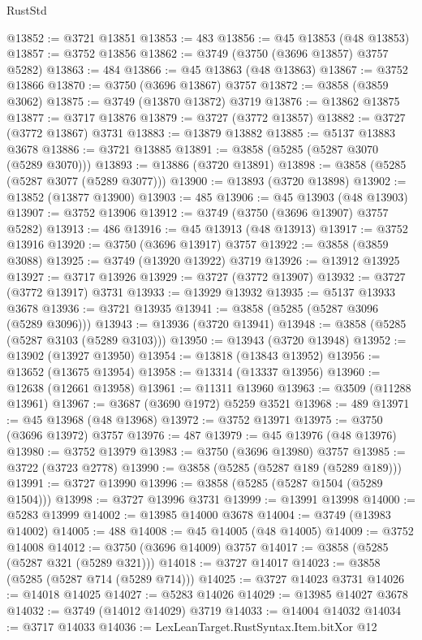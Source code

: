 \begin{lexlean}{RustStd}
\begin{coremodule}
@13852 := @3721 @13851
@13853 := 483
@13856 := @45 @13853 (@48 @13853)
@13857 := @3752 @13856
@13862 := @3749 (@3750 (@3696 @13857) @3757 @5282)
@13863 := 484
@13866 := @45 @13863 (@48 @13863)
@13867 := @3752 @13866
@13870 := @3750 (@3696 @13867) @3757
@13872 := @3858 (@3859 @3062)
@13875 := @3749 (@13870 @13872) @3719
@13876 := @13862 @13875
@13877 := @3717 @13876
@13879 := @3727 (@3772 @13857)
@13882 := @3727 (@3772 @13867) @3731
@13883 := @13879 @13882
@13885 := @5137 @13883 @3678
@13886 := @3721 @13885
@13891 := @3858 (@5285 (@5287 @3070 (@5289 @3070)))
@13893 := @13886 (@3720 @13891)
@13898 := @3858 (@5285 (@5287 @3077 (@5289 @3077)))
@13900 := @13893 (@3720 @13898)
@13902 := @13852 (@13877 @13900)
@13903 := 485
@13906 := @45 @13903 (@48 @13903)
@13907 := @3752 @13906
@13912 := @3749 (@3750 (@3696 @13907) @3757 @5282)
@13913 := 486
@13916 := @45 @13913 (@48 @13913)
@13917 := @3752 @13916
@13920 := @3750 (@3696 @13917) @3757
@13922 := @3858 (@3859 @3088)
@13925 := @3749 (@13920 @13922) @3719
@13926 := @13912 @13925
@13927 := @3717 @13926
@13929 := @3727 (@3772 @13907)
@13932 := @3727 (@3772 @13917) @3731
@13933 := @13929 @13932
@13935 := @5137 @13933 @3678
@13936 := @3721 @13935
@13941 := @3858 (@5285 (@5287 @3096 (@5289 @3096)))
@13943 := @13936 (@3720 @13941)
@13948 := @3858 (@5285 (@5287 @3103 (@5289 @3103)))
@13950 := @13943 (@3720 @13948)
@13952 := @13902 (@13927 @13950)
@13954 := @13818 (@13843 @13952)
@13956 := @13652 (@13675 @13954)
@13958 := @13314 (@13337 @13956)
@13960 := @12638 (@12661 @13958)
@13961 := @11311 @13960
@13963 := @3509 (@11288 @13961)
@13967 := @3687 (@3690 @1972) @5259 @3521
@13968 := 489
@13971 := @45 @13968 (@48 @13968)
@13972 := @3752 @13971
@13975 := @3750 (@3696 @13972) @3757
@13976 := 487
@13979 := @45 @13976 (@48 @13976)
@13980 := @3752 @13979
@13983 := @3750 (@3696 @13980) @3757
@13985 := @3722 (@3723 @2778)
@13990 := @3858 (@5285 (@5287 @189 (@5289 @189)))
@13991 := @3727 @13990
@13996 := @3858 (@5285 (@5287 @1504 (@5289 @1504)))
@13998 := @3727 @13996 @3731
@13999 := @13991 @13998
@14000 := @5283 @13999
@14002 := @13985 @14000 @3678
@14004 := @3749 (@13983 @14002)
@14005 := 488
@14008 := @45 @14005 (@48 @14005)
@14009 := @3752 @14008
@14012 := @3750 (@3696 @14009) @3757
@14017 := @3858 (@5285 (@5287 @321 (@5289 @321)))
@14018 := @3727 @14017
@14023 := @3858 (@5285 (@5287 @714 (@5289 @714)))
@14025 := @3727 @14023 @3731
@14026 := @14018 @14025
@14027 := @5283 @14026
@14029 := @13985 @14027 @3678
@14032 := @3749 (@14012 @14029) @3719
@14033 := @14004 @14032
@14034 := @3717 @14033
@14036 := LexLeanTarget.RustSyntax.Item.bitXor @12

\end{coremodule}
\end{lexlean}
